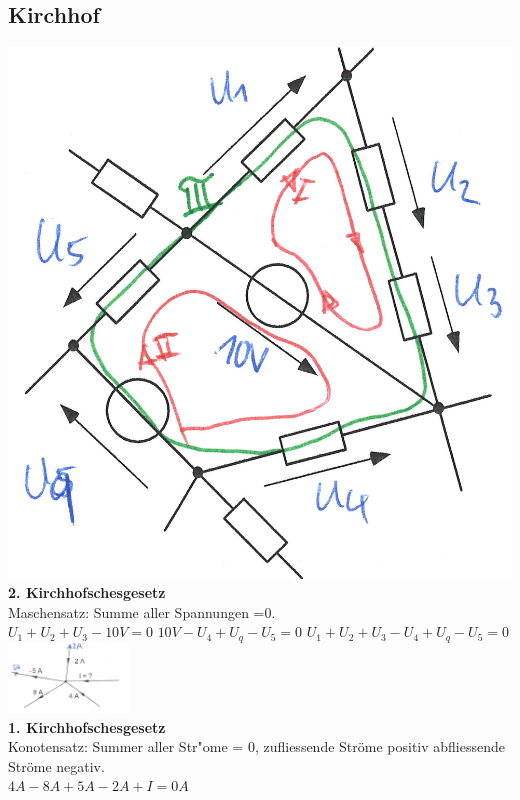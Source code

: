 \subsection{Kirchhof}
\begin{multicols}{4}
{\centering
\includegraphics[width=0.12 \textwidth]{pics/kirchhof/masche}\\}
\textbf{2. Kirchhofschesgesetz}\\
Maschensatz: Summe aller Spannungen =0.\\
	$U_1+U_2+U_3-10V=0$
	$10V-U_4+U_q-U_5=0$
	$U_1+U_2+U_3-U_4+U_q-U_5=0$\\
\includegraphics[width=0.24\textwidth]{pics/kirchhof/knoten}\\
\textbf{1. Kirchhofschesgesetz}\\
Konotensatz: Summer aller Str"ome = 0, zufliessende Ströme positiv abfliessende Ströme negativ.\\
$4A-8A+5A-2A+I=0A$\\
\end{multicols}

